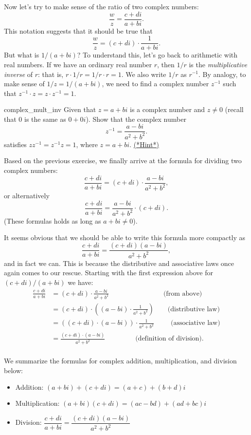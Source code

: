 Now let's try to make sense of the ratio of two complex numbers: 
\[\frac{w}{z}=\frac{c+di} {a+bi}.\] 
This notation suggests that it should be true that  
\[\frac{w}{z}=(c+di)  \cdot \frac{1}{a+bi}. \]
 But what is $1/(a+bi)$?
To understand this, let's go back to arithmetic with real numbers. If we have an ordinary real number $r$, then $1/r$ is the \emph{multiplicative inverse} of $r$: that is, $r \cdot 1/r =1/r \cdot r = 1$. We also write $1/r$ as $r^{-1}$. By analogy, to make sense of $1/z = 1/(a+bi)$, we need to find a complex number $z^{-1}$ such that $z^{-1} \cdot z = z \cdot z^{-1} = 1$.

\begin{exercise}{complex_mult_inv}  Given that $z = a+bi$ is a complex number and $z \neq 0$ (recall that $0$ is the same as $0+0i$).  Show that the complex number
\[ z^{-1}=\frac{a-bi}{a^{2}+b^{2}}.\]
satisfies $zz^{-1}=z^{-1}z=1$, where $z=a+bi$.
\hyperref[sec:complex:hints]{(*Hint*)}
\end{exercise}
Based on the previous exercise, we finally arrive at the formula for dividing two complex numbers:
\[\frac{c+di}{a+bi}=
(c + di) \cdot \frac{a-bi}{a^2 + b^2}, \]
or alternatively
\[\frac{c+di}{a+bi}=  \frac{a-bi}{a^2 + b^2} \cdot (c + di).\]
(These formulas holds as long as $a+bi \neq 0$). 

It seems obvious that we should be able to write this formula more compactly as
\[\frac{c+di}{a+bi}=
 \frac{(c+di)(a-bi)}{a^2 + b^2}, \]
and in fact we can. This is because the distributive and associative laws once again comes to our rescue. Starting with the first expression above for $(c + di) / (a + bi)$ we have:
\begin{align*}
\frac{c+di}{a+bi}&=
(c + di) \cdot \frac{a-bi}{a^2 + b^2} \qquad \qquad \qquad  \qquad \textrm{(from above)}\\
& = (c + di) \cdot \left( (a-bi) \cdot \frac{1}{a^2 + b^2}\right) \qquad \textrm{(distributive law)}\\
& = ((c + di) \cdot  (a-bi)) \cdot \frac{1}{a^2 + b^2} \qquad ~~\textrm{(associative law)}\\
& = \frac{(c + di) \cdot  (a-bi)}{a^2 + b^2} \qquad \qquad ~~\textrm{(definition of division).}\\
\end{align*}

We summarize the formulas for complex addition, multiplication, and division below:
\begin{itemize}

\item
Addition:  $(a+bi)+(c+di) = (a+c)+(b+d)i$

\item
Multiplication:  $(a+bi)(c+di) = (ac-bd)+(ad+bc)i$

\item
Division:  $\dfrac{c+di}{a+bi} = \dfrac{(c+di)(a-bi)}{a^2+b^2}$
\end{itemize}

